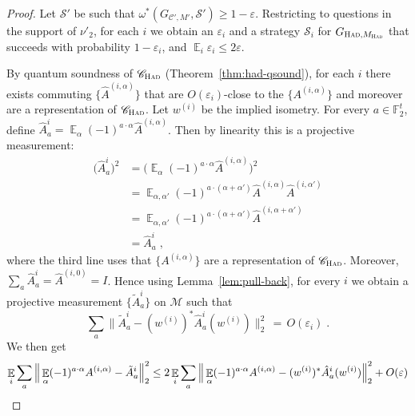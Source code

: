 \documentclass[11pt]{article}
\theoremstyle{definition}
\newcommand{\code}{\mathscr{C}}
\newcommand{\strategy}{\mathscr{S}}
\newcommand{\Id}{\ensuremath{I}}
\DeclareMathOperator*{\Expectation}{\mathbb{E}}
\newcommand{\Es}[1]{\Expectation_{#1}}
\newcommand{\F}{\ensuremath{\mathbb{F}}}
\newcommand{\cM}{\ensuremath{\mathcal{M}}}
\newcommand{\Had}{\ensuremath{\textsc{Had}}}
\newcommand{\had}{\textsc{Had}}
\newcommand{\eps}{\varepsilon}
\begin{document}
\begin{proof}
Let $\strategy'$ be such that $\omega^*(G_{\code',M'},\strategy')\geq 1-\eps$. Restricting to questions in the support of $\nu'_2$, for each $i$ we obtain an $\eps_i$ and a strategy $\strategy_i$ for $G_{\had,M_\had}$ that succeeds with probability $1-\eps_i$, and $\Es{i} \eps_i \leq 2\eps$. 

By quantum soundness of $\code_\Had$ (Theorem~\ref{thm:had-qsound}), for each $i$ there exists commuting $\{\hat{A}^{(i,\alpha)}\}$ that are $O(\eps_i)$-close to the $\{A^{(i,\alpha)}\}$ and moreover are a representation of $\code_{\Had}$. Let $w^{(i)}$ be the implied isometry. For every $a\in \F_2^t$, define $\hat{A}^{i}_{a}=\Es{\alpha}(-1)^{a\cdot \alpha} \hat{A}^{(i,\alpha)}$. Then by linearity this is a projective measurement:
\begin{align*}
\big(\hat{A}^{i}_{a}\big)^2 &=\Big(\Es{\alpha}(-1)^{a\cdot \alpha} \hat{A}^{(i,\alpha)}\Big)^2\\
&= \Es{\alpha,\alpha' }(-1)^{a\cdot (\alpha+\alpha')} \hat{A}^{(i,\alpha)}\hat{A}^{(i,\alpha')}\\
&=\Es{\alpha,\alpha' }(-1)^{a\cdot (\alpha+\alpha')} \hat{A}^{(i,\alpha+\alpha')}\\
&=\hat{A}^{i}_{a}\;,
\end{align*}
where the third line uses that  $\{A^{(i,\alpha)}\}$ are a representation of $\code_{\Had}$. Moreover, $\sum_a \hat{A}^{i}_{a} = \hat{A}^{(i,0)}=\Id$. Hence using Lemma~\ref{lem:pull-back}, for every $i$ we obtain a projective measurement $\{\tilde{A}^{i}_{a}\}$ on $\cM$ such that
\begin{equation}\label{eq:qto2-1a}
 \sum_a \big\| \tilde{A}^i_a - (w^{(i)})^* \hat{A}^i_a (w^{(i)}) \big\|_2^2 \,=\, O(\eps_i)\;.
\end{equation}
We then get
\begin{align}
 \Es{i} \sum_a \Big\| \Es{\alpha} (-1)^{a\cdot \alpha} A^{(i,\alpha)} -  \tilde{A}^i_a \Big\|_2^2 
&\leq  2\Es{i} \sum_a \Big\| \Es{\alpha} (-1)^{a\cdot \alpha} A^{(i,\alpha)} -  (w^{(i)})^* \hat{A}^i_a (w^{(i)}) \Big\|_2^2 + O(\eps)\notag\\

\end{align}
\end{proof}
\end{document}
